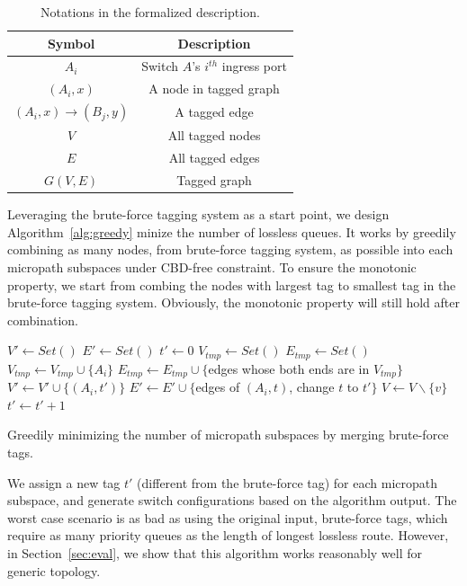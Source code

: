 \begin{table}
\small
\centering
\begin{tabular}{|c|c|}
\hline
Symbol & Description \\ \hline
$A_i$ & Switch $A$'s $i^{th}$ ingress port  \\ \hline
$(A_i, x)$ & A node in tagged graph \\ \hline
$(A_i, x)\rightarrow(B_j, y)$ & A tagged edge \\ \hline
$V$ & All tagged nodes  \\ \hline
$E$ & All tagged edges \\ \hline
$G(V, E)$ & Tagged graph \\ \hline
\end{tabular}
\caption{Notations in the formalized description.}
\label{tab:symbols}
\end{table}

 Leveraging the brute-force tagging system as a start
point, we design Algorithm~\ref{alg:greedy} minize the number of lossless
queues. It works by greedily combining as many nodes, from brute-force tagging
system, as possible into each micropath subspaces under CBD-free constraint. To
ensure the monotonic property, we start from combing the nodes with largest tag
to smallest tag in the brute-force tagging system.  Obviously, the monotonic
property will still hold after combination. 

\begin{algorithm}
	\small
	$V' \gets Set()$\;
	$E' \gets Set()$\;
	$t' \gets 0$\;
	 {
		$V_{tmp} \gets Set()$\;
		$E_{tmp} \gets Set()$\;
		 {
			$V_{tmp} \gets V_{tmp} \cup \{A_i\}$\;
			$E_{tmp} \gets E_{tmp} \cup \{$edges whose both ends are in $V_{tmp}\}$\;
			 {
				$V' \gets V' \cup \{(A_i, t')\}$\;
				$E' \gets E' \cup \{$edges of $(A_i, t)$, change $t$ to $t'\}$\; 
			}
			$V \gets V \backslash \{v\}$ \;
		}
		 {
			$t' \gets t'+1$\;
		}
	}
	\;
    \caption{Greedily minimizing the number of micropath subspaces by merging brute-force tags.}
	\label{alg:greedy}
\end{algorithm}

We assign a new tag $t'$ (different from the brute-force tag) for each micropath
subspace, and generate switch configurations based on the algorithm output. The
worst case scenario is as bad as using the original input, brute-force tags,
which require as many priority queues as the length of longest lossless route.
However, in Section~\ref{sec:eval}, we show that this algorithm works reasonably
well for generic topology.  
